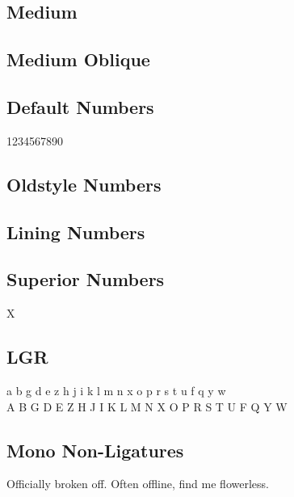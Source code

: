 \documentclass{article}
\begin{document}
\textbf{\textsl{\lipsum[3]}}

\subsection*{Medium}
{\firamonomedium\lipsum[8]}

\subsection*{Medium Oblique}
{\firamonomedium\textsl{\lipsum[8]}}

\subsection*{Default Numbers}

1234567890

\subsection*{Oldstyle Numbers}

{}

\subsection*{Lining Numbers}

{}

\subsection*{Superior Numbers}

X{}

\subsection*{LGR}

{\firamonolgr\noindent
 a b g d e z h j i k l m n x o p r s t u f q y w\\
 A B G D E Z H J I K L M N X O P R S T U F Q Y W
}

\subsection*{Mono Non-Ligatures}

Officially broken off. Often offline, find me flowerless.
\end{document}
